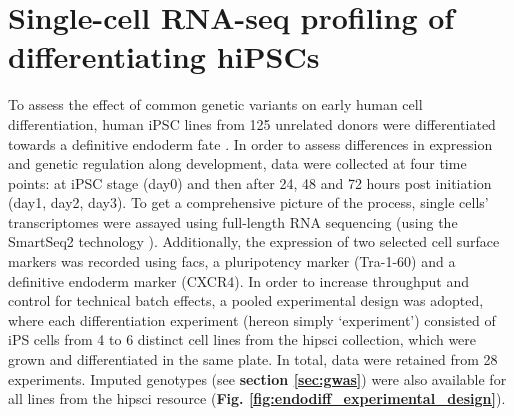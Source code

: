 


\newpage

\section{Single-cell RNA-seq profiling of differentiating hiPSCs}
\label{sec:endodiff_summary}

To assess the effect of common genetic variants on early human cell differentiation, human iPSC lines from 125 unrelated donors were differentiated towards a definitive endoderm fate \cite{hannan2013production}.
In order to assess differences in expression and genetic regulation along development, data were collected at four 
time points: at iPSC stage (day0) and then after 24, 48 and 72 hours post initiation (day1, day2, day3).
To get a comprehensive picture of the process, single cells' transcriptomes were assayed using full-length RNA sequencing (using the SmartSeq2 technology \cite{picelli2013smart}).
Additionally, the expression of two selected cell surface markers was recorded using \gls{facs}, a pluripotency marker (Tra-1-60) and a definitive endoderm marker (CXCR4).
In order to increase throughput and control for technical batch effects, 
a pooled experimental design
was adopted, where each differentiation experiment (hereon simply `experiment') consisted of iPS cells from 4 to 6 distinct cell lines from the \gls{hipsci} collection, which were grown and differentiated in the same plate.
In total, data were retained from 28 experiments.
Imputed genotypes (see \textbf{section \ref{sec:gwas}}) were also available for all lines from the \gls{hipsci} resource (\textbf{Fig. \ref{fig:endodiff_experimental_design}}).

